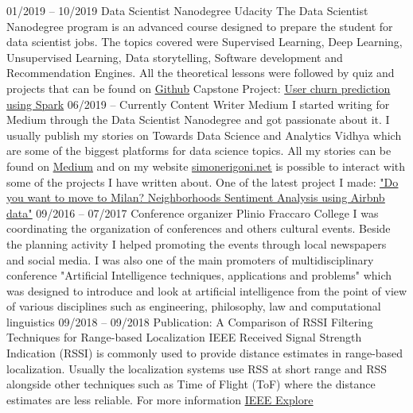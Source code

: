 \documentclass[9pt]{developercv} %
\begin{document}
\begin{entrylist}
	\entry
		{01/2019 -- 10/2019}
		{Data Scientist Nanodegree}
		{Udacity}
		{The Data Scientist Nanodegree program is an advanced course designed to prepare the student for data scientist jobs. The topics covered were Supervised Learning, Deep Learning, Unsupervised Learning, Data storytelling, Software development and Recommendation Engines. All the theoretical lessons were followed by quiz and projects that can be found on \underline{\href{https://github.com/simonerigoni/udacity/tree/master/data_scientist_nanodegree}{Github}}}
		{}
		{Capstone Project: \underline{\href{https://towardsdatascience.com/user-churn-prediction-using-spark-22ff8dafb5c}{User churn prediction using Spark}}}
	\entry
		{06/2019 -- Currently}
		{Content Writer}
		{Medium}
		{I started writing for Medium through the Data Scientist Nanodegree and got passionate about it. I usually publish my stories on Towards Data Science and Analytics Vidhya which are some of the biggest platforms for data science topics. All my stories can be found on \underline{\href{https://medium.com/@simone.rigoni01}{Medium}} and on my website \underline{\href{http://www.simonerigoni.net}{simonerigoni.net}} is possible to interact with some of the projects I have written about. One of the latest project I made: \underline{\href{https://towardsdatascience.com/do-you-want-to-move-to-milan-neighborhoods-sentiment-analysis-using-airbnb-data-72db72ebc070}{"Do you want to move to Milan? Neighborhoods Sentiment Analysis using Airbnb data"}}}
		{}
		{}
	\entry
		{09/2016 -- 07/2017}
		{Conference organizer}
		{Plinio Fraccaro College}
		{I was coordinating the organization of conferences and others cultural events. Beside the planning activity I helped promoting the events through local newspapers and social media. I was also one of the main promoters of multidisciplinary conference "Artificial Intelligence techniques, applications and problems" which was designed to introduce and look at artificial intelligence from the point of view of various disciplines such as engineering, philosophy, law and computational linguistics}
		{}
		{}
	\entry
		{09/2018 -- 09/2018}
		{Publication: A Comparison of RSSI Filtering Techniques for Range-based Localization}
		{IEEE}
		{Received Signal Strength Indication (RSSI) is commonly used to provide distance estimates in range-based localization. Usually the localization systems use RSS at short range and RSS alongside other techniques such as Time of Flight (ToF) where the distance estimates are less reliable. For more information \underline{\href{https://ieeexplore.ieee.org/abstract/document/8502556}{IEEE Explore}}}

\end{entrylist}
\end{document}
